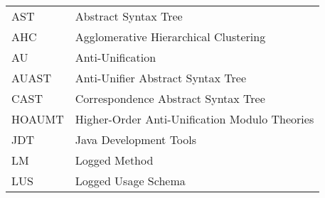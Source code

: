 \begin{tabular}{ll}
AST & Abstract Syntax Tree\\
AHC & Agglomerative Hierarchical Clustering\\
AU & Anti-Unification \\
AUAST & Anti-Unifier Abstract Syntax Tree\\
CAST & Correspondence Abstract Syntax Tree\\
HOAUMT & Higher-Order Anti-Unification Modulo Theories\\
JDT & Java Development Tools\\
LM & Logged Method\\
LUS & Logged Usage Schema\\
\end{tabular}
